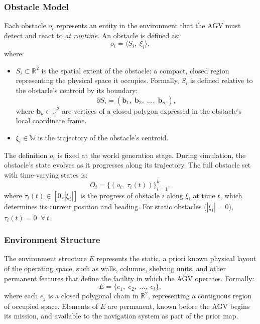 \documentclass[conference]{IEEEtran}
\begin{document}
\subsubsection{Obstacle Model}
\label{sec:obstacle-model}
Each obstacle $o_i$ represents an entity in the environment that the AGV must detect and react to \emph{at runtime}. An obstacle is defined as:
\begin{equation}
\label{eq:obstacle}
    o_i = \langle S_i,\; \xi_i \rangle,
\end{equation}
where:
\begin{itemize}
    \item $S_i \subset \mathbb{R}^2$ is the spatial extent of the obstacle: a compact, closed region representing the physical space it occupies. Formally, $S_i$ is defined relative to the obstacle's centroid by its boundary:
    \begin{equation}
    \label{eq:spatial-descriptor}
        \partial S_i = (\mathbf{b}_1,\; \mathbf{b}_2,\; \ldots,\; \mathbf{b}_{n_i}),
    \end{equation}
    where $\mathbf{b}_k \in \mathbb{R}^2$ are vertices of a closed polygon expressed in the obstacle's local coordinate frame.
    \item $\xi_i \in \mathbb{W}$ is the trajectory of the obstacle's centroid.
\end{itemize}
The definition $o_i$ is fixed at the world generation stage. During simulation, the obstacle's state evolves as it progresses along its trajectory. 
The full obstacle set with time-varying states is:
\begin{equation}
\label{eq:obstacle-set}
    O_t = \{(o_i,\; \tau_i(t))\}_{i=1}^{k},
\end{equation}
where $\tau_i(t) \in [0, |\xi_i|]$ is the progress of obstacle $i$ along $\xi_i$ at time $t$, which determines its current position and heading.  
For static obstacles ($|\xi_i| = 0$), $\tau_i(t) = 0\;\;\forall\, t$. 
 
 
\subsubsection{Environment Structure}
\label{sec:environment-structure}
The environment structure $E$ represents the static, a priori known physical layout of the operating space, such as walls, columns, shelving units, and other permanent features that define the facility in which the AGV operates. Formally:
\begin{equation}
\label{eq:environment}
    E = \{e_1,\; e_2,\; \ldots,\; e_l\},
\end{equation}
where each $e_j$ is a closed polygonal chain in $\mathbb{R}^2$, representing a contiguous region of occupied space. Elements of $E$ are permanent, known before the AGV begins its mission, and available to the navigation system as part of the prior map.
 
\end{document}
